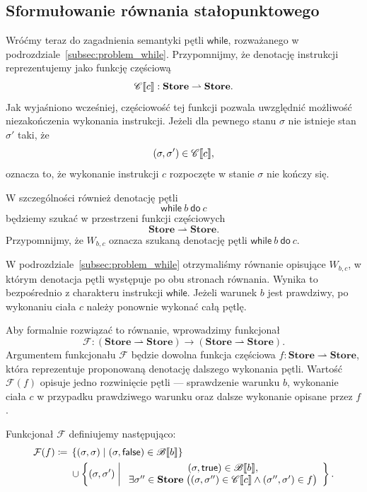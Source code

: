\documentclass[11pt,a4paper]{article}
\theoremstyle{definition}
\theoremstyle{plain}
\DeclarePairedDelimiter{\semdelim}{\llbracket}{\rrbracket}
\newcommand{\sem}[1]{\semdelim{#1}}
\newcommand{\Cc}{\mathscr{C}}   %
\newcommand{\Bb}{\mathscr{B}}   %
\newcommand{\Store}{\textbf{Store}}
\newcommand{\kw}[1]{\ensuremath{\mathsf{#1}}} %
\begin{document}
\subsection{Sformułowanie równania stałopunktowego}

Wróćmy teraz do zagadnienia semantyki pętli \kw{while}, rozważanego
w podrozdziale~\ref{subsec:problem_while}. Przypomnijmy, że denotację
instrukcji reprezentujemy jako funkcję częściową
\[
\Cc\sem{c}:\Store\rightharpoonup\Store.
\]
Jak wyjaśniono wcześniej, częściowość tej funkcji pozwala uwzględnić
możliwość niezakończenia wykonania instrukcji. Jeżeli dla pewnego stanu
$\sigma$ nie istnieje stan $\sigma'$ taki, że
\[
(\sigma,\sigma')\in\Cc\sem{c},
\]
oznacza to, że wykonanie instrukcji $c$ rozpoczęte w stanie $\sigma$
nie kończy się.

W szczególności również denotację pętli
\[
\kw{while}\ b\ \kw{do}\ c
\]
będziemy szukać w przestrzeni funkcji częściowych
\[
\Store\rightharpoonup\Store.
\]
Przypomnijmy, że $W_{b,c}$ oznacza szukaną denotację pętli
$\kw{while}\ b\ \kw{do}\ c$.

W podrozdziale~\ref{subsec:problem_while} otrzymaliśmy równanie
opisujące $W_{b,c}$, w którym denotacja pętli występuje po obu stronach
równania. Wynika to bezpośrednio z charakteru instrukcji \kw{while}.
Jeżeli warunek $b$ jest prawdziwy, po wykonaniu ciała $c$ należy ponownie
wykonać całą pętlę.

Aby formalnie rozwiązać to równanie, wprowadzimy funkcjonał
\[
\mathcal{F}:
(\Store\rightharpoonup\Store)
\longrightarrow
(\Store\rightharpoonup\Store).
\]
Argumentem funkcjonału $\mathcal{F}$ będzie dowolna funkcja częściowa
$f:\Store\rightharpoonup\Store$, która reprezentuje proponowaną
denotację dalszego wykonania pętli. Wartość $\mathcal{F}(f)$ opisuje
jedno rozwinięcie pętli --- sprawdzenie warunku $b$, wykonanie ciała $c$
w przypadku prawdziwego warunku oraz dalsze wykonanie opisane przez
$f$.

Funkcjonał $\mathcal{F}$ definiujemy następująco:
\[
\begin{aligned}
	\mathcal{F}(f)
	\coloneqq{}&
	\left\{
	(\sigma,\sigma)
	\;\middle|\;
	(\sigma,\kw{false})\in\Bb\sem{b}
	\right\}\\
	&{}\cup
	\left\{
	(\sigma,\sigma')
	\;\middle|\;
	\begin{array}{c}
		(\sigma,\kw{true})\in\Bb\sem{b},\\
		\exists\sigma''\in\Store\;
		\big(
		(\sigma,\sigma'')\in\Cc\sem{c}
		\land
		(\sigma'',\sigma')\in f
		\big)
	\end{array}
	\right\}.
\end{aligned}
\]
\end{document}
